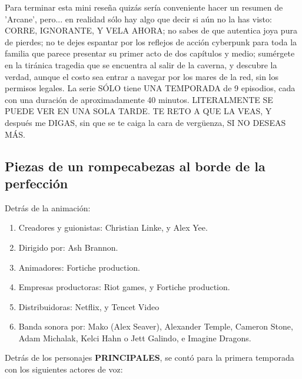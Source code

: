 \documentclass[11pt,a5paper]{article}
\begin{document}
Para terminar esta mini reseña quizás sería conveniente hacer un resumen de 'Arcane', pero... en realidad sólo hay algo que decir si aún no la has visto: CORRE, IGNORANTE, Y VELA AHORA; no sabes de que autentica joya pura de pierdes; no te dejes espantar por los reflejos de acción cyberpunk para toda la familia que parece presentar su primer acto de dos capítulos y medio; sumérgete en la tiránica tragedia que se encuentra al salir de la caverna, y descubre la verdad, aunque el costo sea entrar a navegar por los mares de la red, sin los permisos legales. La serie SÓLO tiene UNA TEMPORADA de 9 episodios, cada con una duración de aproximadamente 40 minutos. LITERALMENTE SE PUEDE VER EN UNA SOLA TARDE. TE RETO A QUE LA VEAS, Y después me DIGAS, sin que se te caiga la cara de vergüenza, SI NO DESEAS MÁS.

    \subsection*{{\large{\textsf{\hspace{1cm}Piezas de un rompecabezas al borde de la perfección}}}}

Detrás de la animación:

\begin{enumerate}
    \item Creadores y guionistas: Christian Linke, y Alex Yee.
    \item Dirigido por: Ash Brannon.
    \item Animadores: Fortiche production.
    \item Empresas productoras: Riot games, y Fortiche production.
    \item Distribuidoras: Netflix, y Tencet Video
    \item Banda sonora por: Mako (Alex Seaver), Alexander Temple, Cameron Stone, Adam Michalak, Kelci Hahn o Jett Galindo, e Imagine Dragons.
\end{enumerate}

Detrás de los personajes {\textbf{PRINCIPALES}}, se contó para la primera temporada con los siguientes actores de voz:
\end{document}
